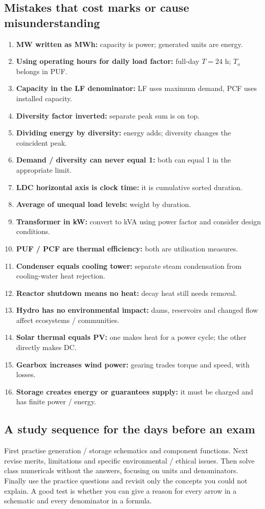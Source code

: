 \documentclass[11pt,a4paper]{article}
\begin{document}
\subsection{Mistakes that cost marks or cause misunderstanding}
\begin{enumerate}
\item \textbf{MW written as MWh:} capacity is power; generated units are energy.
\item \textbf{Using operating hours for daily load factor:} full-day $T=24$ h; $T_o$ belongs in PUF.
\item \textbf{Capacity in the LF denominator:} LF uses maximum demand, PCF uses installed capacity.
\item \textbf{Diversity factor inverted:} separate peak sum is on top.
\item \textbf{Dividing energy by diversity:} energy adds; diversity changes the coincident peak.
\item \textbf{Demand / diversity can never equal 1:} both can equal 1 in the appropriate limit.
\item \textbf{LDC horizontal axis is clock time:} it is cumulative sorted duration.
\item \textbf{Average of unequal load levels:} weight by duration.
\item \textbf{Transformer in kW:} convert to kVA using power factor and consider design conditions.
\item \textbf{PUF / PCF are thermal efficiency:} both are utilisation measures.
\item \textbf{Condenser equals cooling tower:} separate steam condensation from cooling-water heat rejection.
\item \textbf{Reactor shutdown means no heat:} decay heat still needs removal.
\item \textbf{Hydro has no environmental impact:} dams, reservoirs and changed flow affect ecosystems / communities.
\item \textbf{Solar thermal equals PV:} one makes heat for a power cycle; the other directly makes DC.
\item \textbf{Gearbox increases wind power:} gearing trades torque and speed, with losses.
\item \textbf{Storage creates energy or guarantees supply:} it must be charged and has finite power / energy.
\end{enumerate}

\subsection{A study sequence for the days before an exam}
First practise generation / storage schematics and component functions. Next revise merits, limitations and specific environmental / ethical issues. Then solve class numericals without the answers, focusing on units and denominators. Finally use the practice questions and revisit only the concepts you could not explain. A good test is whether you can give a reason for every arrow in a schematic and every denominator in a formula.
\end{document}
